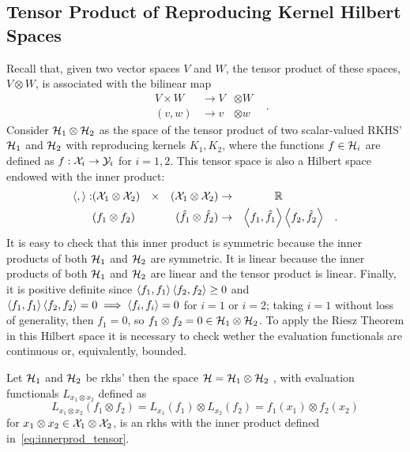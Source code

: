 \subsection{Tensor Product of Reproducing Kernel Hilbert Spaces}
Recall that, given two vector spaces $V$ and $W$, the tensor product of these spaces, $V \otimes W$, is associated with the bilinear map
\begin{equation}
    \nonumber
    \begin{aligned}
        &V \times W &\to V &\otimes W & \\
    &(v, w)  &\to v &\otimes w &
    \end{aligned}.
\end{equation}
Consider $\mathcal{H}_1 \otimes \mathcal{H}_2$ as the space of the tensor product of two scalar-valued RKHS' $\mathcal{H}_1$ and $\mathcal{H}_2$ with reproducing kernels $K_1, K_2$, where the functions $f \in \mathcal{H}_i$ are defined as $f: \mathcal{X}_i \to \mathcal{Y}_i$ for $i=1, 2$. This tensor space is also a Hilbert space endowed with the inner product:
\begin{equation}
    \label{eq:innerprod_tensor}
    \begin{aligned}
        \dotp{}{}: &(\Xspace_1 \otimes \Xspace_2) &\times& &(\Xspace_1 \otimes \Xspace_2) &\to &\reals &&  \\
    &(f_1 \otimes f_2) && &(\hat{f}_1 \otimes \hat{f}_2) &\to &\dotp{f_1}{\hat{f}_1} & \dotp{f_2}{\hat{f}_2} &.
    \end{aligned}
\end{equation}
It is easy to check that this inner product is symmetric because the inner products of both $\mathcal{H}_1$ and $\mathcal{H}_2$ are symmetric. It is linear because the inner products of both $\mathcal{H}_1$ and $\mathcal{H}_2$ are linear and the tensor product is linear. Finally, it is positive definite since 
$  \left\langle f_1, f_1 \right\rangle  \left\langle f_2, f_2 \right\rangle \geq 0$ and
$\left\langle f_1, f_1 \right\rangle  \left\langle f_2, f_2 \right\rangle = 0 \implies \left\langle f_i, f_i \right\rangle = 0$ for $i=1$ or $i=2$; taking $i=1$ without loss of generality, then $f_1 = 0$, so $f_1 \otimes f_2 = 0 \in \mathcal{H}_1 \otimes \mathcal{H}_2$. To apply the Riesz Theorem in this Hilbert space it is necessary to check wether the evaluation functionals are continuous or, equivalently, bounded.
%
\begin{proposition}
    Let $\mathcal{H}_1$ and $\mathcal{H}_2$ be \acrshort{rkhs}'  then
    the space $\mathcal{H} = \mathcal{H}_1 \otimes \mathcal{H}_2$ , with evaluation functionals $L_{x_1 \otimes x_2} $ defined as 
    $$L_{x_1 \otimes x_2} (f_1 \otimes f_2) =L_{x_1}(f_1) \otimes L_{x_2}(f_2) = f_1(x_1) \otimes f_2(x_2)$$
    for $x_1 \otimes x_2 \in \mathcal{X}_1 \otimes \mathcal{X}_2$,
     is an \acrshort{rkhs} with the inner product defined in~\eqref{eq:innerprod_tensor}. 
\end{proposition}
